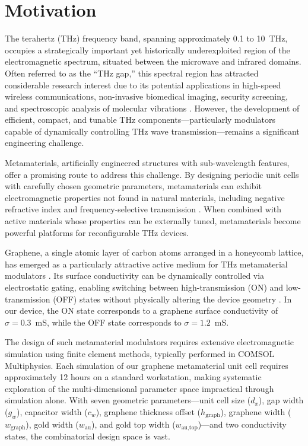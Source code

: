 \documentclass[12pt,a4paper]{report}
\begin{document}
\section{Motivation}
\label{sec:motivation}

The terahertz (THz) frequency band, spanning approximately 0.1 to 10~THz, occupies a strategically important yet historically underexploited region of the electromagnetic spectrum, situated between the microwave and infrared domains. Often referred to as the ``THz gap,'' this spectral region has attracted considerable research interest due to its potential applications in high-speed wireless communications, non-invasive biomedical imaging, security screening, and spectroscopic analysis of molecular vibrations \citep{tonouchi2007}. However, the development of efficient, compact, and tunable THz components---particularly modulators capable of dynamically controlling THz wave transmission---remains a significant engineering challenge.

Metamaterials, artificially engineered structures with sub-wavelength features, offer a promising route to address this challenge. By designing periodic unit cells with carefully chosen geometric parameters, metamaterials can exhibit electromagnetic properties not found in natural materials, including negative refractive index and frequency-selective transmission \citep{pendry1999, smith2000}. When combined with active materials whose properties can be externally tuned, metamaterials become powerful platforms for reconfigurable THz devices.

Graphene, a single atomic layer of carbon atoms arranged in a honeycomb lattice, has emerged as a particularly attractive active medium for THz metamaterial modulators \citep{novoselov2004}. Its surface conductivity can be dynamically controlled via electrostatic gating, enabling switching between high-transmission (ON) and low-transmission (OFF) states without physically altering the device geometry \citep{sensale2012, lee2012}. In our device, the ON state corresponds to a graphene surface conductivity of $\sigma = 0.3$~mS, while the OFF state corresponds to $\sigma = 1.2$~mS.

The design of such metamaterial modulators requires extensive electromagnetic simulation using finite element methods, typically performed in COMSOL Multiphysics. Each simulation of our graphene metamaterial unit cell requires approximately 12 hours on a standard workstation, making systematic exploration of the multi-dimensional parameter space impractical through simulation alone. With seven geometric parameters---unit cell size ($d_x$), gap width ($g_w$), capacitor width ($c_w$), graphene thickness offset ($h_{\text{graph}}$), graphene width ($w_{\text{graph}}$), gold width ($w_{\text{au}}$), and gold top width ($w_{\text{au,top}}$)---and two conductivity states, the combinatorial design space is vast.
\end{document}
